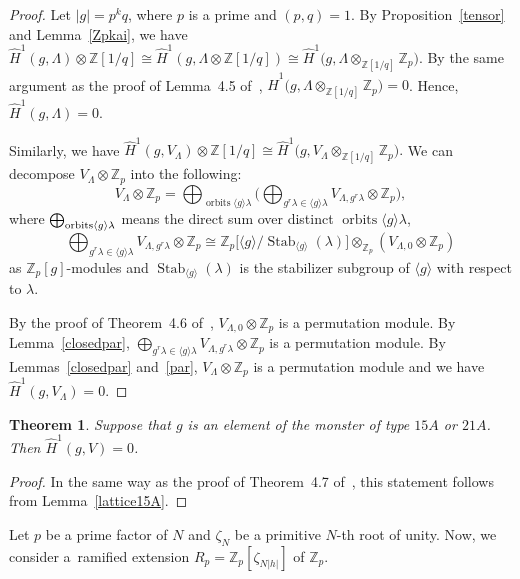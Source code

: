 \documentclass[10pt,a4paper]{amsart}
\numberwithin{equation}{section}
\newtheorem{Theorem}{Theorem}[section]
\begin{document}
\begin{proof}
Let $|g|=p^kq$, where $p$ is a prime and $(p,q)=1$. By Proposition~\ref{tensor} and Lemma~\ref{Zpkai}, we have $\hat{H}^1(g,\Lambda)\otimes \mathbb{Z}[1/q]\cong \hat{H}^1(g,\Lambda \otimes \mathbb{Z}[1/q])\cong \hat{H}^1\big(g,\Lambda \otimes_{\mathbb{Z}[1/q]}\mathbb{Z}_p\big)$. By the same argument as the proof of Lemma~4.5 of~\cite{BR}, $\hat{H}^1\big(g,\Lambda \otimes_{\mathbb{Z}[1/q]}\mathbb{Z}_p\big)=0$. Hence, $\hat{H}^1(g,\Lambda)=0$.

Similarly, we have $\hat{H}^1(g,V_\Lambda)\otimes \mathbb{Z}[1/q]\cong \hat{H}^1\big(g,V_\Lambda \otimes_{\mathbb{Z}[1/q]}\mathbb{Z}_p\big).$ We can decompose $V_\Lambda \otimes \mathbb{Z}_p$ into the following:
\[
V_\Lambda \otimes \mathbb{Z}_p=\bigoplus_{\operatorname{orbits} \langle g \rangle \lambda}\bigg( \bigoplus_{g^r\lambda \in \langle g \rangle \lambda} V_{\Lambda ,g^r\lambda}\otimes \mathbb{Z}_p \bigg),
\]
where $\bigoplus_{{{\rm orbits} \langle g \rangle \lambda}}$ means the direct sum over distinct $\operatorname{orbits} \langle g \rangle \lambda$,
\[
\bigoplus_{g^r\lambda \in \langle g \rangle \lambda}V_{\Lambda,g^r\lambda}\otimes \mathbb{Z}_p\cong \mathbb{Z}_p\lbrack \langle g\rangle /\operatorname{Stab}_{\langle g \rangle}(\lambda)\rbrack \otimes_{\mathbb{Z}_p} (V_{\Lambda,0}\otimes \mathbb{Z}_p)
\]
 as $\mathbb{Z}_p[g]$-modules and $\operatorname{Stab}_{\langle g \rangle}(\lambda)$ is the stabilizer subgroup of $\langle g \rangle$ with respect to $\lambda$.

By the proof of Theorem~4.6 of~\cite{BR}, $V_{\Lambda,0}\otimes \mathbb{Z}_p$ is a permutation module. By Lemma~\ref{closedpar}, $\bigoplus_{g^r\lambda \in \langle g \rangle \lambda} V_{\Lambda ,g^r\lambda}\otimes \mathbb{Z}_p$ is a permutation module. By Lemmas~\ref{closedpar} and~\ref{par}, $V_\Lambda \otimes \mathbb{Z}_p$ is a permutation module and we have $\hat{H}^1(g,V_\Lambda)=0$.
\end{proof}

\begin{Theorem}\label{15A21A}
Suppose that $g$ is an element of the monster of type $15A$ or $21A$. Then $\hat{H}^1(g,V)=0$.
\end{Theorem}

\begin{proof}
In the same way as the proof of Theorem~4.7 of~\cite{BR}, this statement follows from Lemma~\ref{lattice15A}.
\end{proof}

Let $p$ be a prime factor of $N$ and $\zeta_N$ be a primitive $N$-th root of unity. Now, we consider a~ramified extension $R_p=\mathbb{Z}_p[\zeta_{N|h|}]$ of $\mathbb{Z}_p$.
\end{document}
